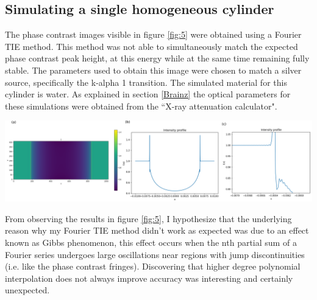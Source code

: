 \documentclass[10pt, a4paper, singlespacing]{report}
\newenvironment{Figure}
    {\par\medskip\noindent\minipage{\linewidth}}
    {\endminipage\par\medskip}
\begin{document}
\subsection{Simulating a single homogeneous cylinder}\label{Single cylinder}
The phase contrast images visible in figure \ref{fig:5} were obtained using a Fourier TIE method. This method was not able to simultaneously match the expected phase contrast peak height, at this energy while at the same time remaining fully stable. The parameters used to obtain this image were chosen to match a silver source, specifically the k-alpha 1 transition. The simulated material for this cylinder is water. As explained in section \ref{Brainz} the optical parameters for these simulations were obtained from the ``X-ray attenuation calculator".
\begin{Figure}\label{fig:5}
\centering
\includegraphics[width=\linewidth]{Fourier_intensity_profile.pdf}
\end{Figure}
From observing the results in figure \ref{fig:5}, I hypothesize that the underlying reason why my Fourier TIE method didn't work as expected was due to an effect known as Gibbs phenomenon, this effect occurs when the nth partial sum of a Fourier series undergoes large oscillations near regions with jump discontinuities\cite{Gibbs} (i.e. like the phase contrast fringes). Discovering that higher degree polynomial interpolation does not always improve accuracy was interesting and certainly unexpected.
\end{document}
